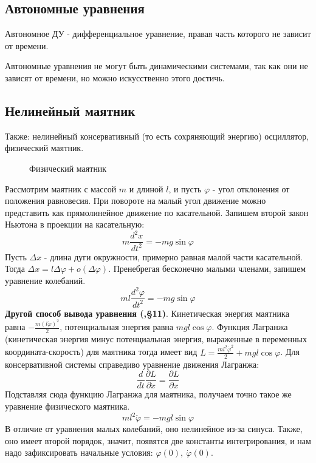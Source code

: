 \subsection{Автономные уравнения}
\begin{defin}
Автономное ДУ - дифференциальное уравнение, правая часть которого не зависит
от времени.
\end{defin}
Автономные уравнения не могут быть динамическими системами, так как они 
не зависят от времени, но можно искусственно этого достичь.
\subsection{Нелинейный маятник}
Также: нелинейный консервативный (то есть сохряняющий энергию)
осциллятор, физический маятник. 
\begin{figure}[H]
    \centering
    \caption{Физический маятник}
    \label{fig:figures-pendulum-pdf_tex}
\end{figure}
Рассмотрим маятник с массой $m$ и длиной $l$, и пусть 
$\varphi$ - угол отклонения от положения равновесия. При повороте на малый 
угол движение можно представить как прямолинейное движение по касательной.
Запишем второй закон Ньютона в проекции на касательную: 
$$m\frac{d^2x}{dt^2}=-mg\sin\varphi$$ 
Пусть $\Delta x$ - длина дуги окружности, примерно равная малой части 
касательной. Тогда  $\Delta x=l\Delta\varphi+o(\Delta\varphi)$.
Пренебрегая бесконечно малыми членами, запишем уравнение колебаний. 
$$ml \frac{d^2\varphi}{dt^2}=-mg\sin\varphi$$ 
\textbf{Другой способ вывода уравнения (\cite{Landau},\S11)}. 
Кинетическая энергия маятника равна $-\frac{m(l\dot\varphi)^2}{2}$,
потенциальная энергия равна $mgl\cos\varphi$. Функция Лагранжа
(кинетическая энергия минус потенциальная энергия, выраженные в переменных
координата-скорость) для маятника тогда имеет вид
$L=\frac{ml^2\dot\varphi^2}{2}+mgl\cos\varphi$. Для консервативной системы
справедиво уравнение движения Лагранжа:
$$\frac{d}{dt}\frac{\partial L}{\partial \dot x}
=\frac{\partial L}{\partial x}$$
Подставляя сюда функцию Лагранжа для маятника, получаем точно такое же 
уравнение физического маятника. 
$$ml^2\ddot \varphi = -mgl\sin\varphi$$
В отличие от уравнения малых колебаний, оно нелинейное из-за синуса. 
Также, оно имеет второй порядок, значит, появятся две константы интегрирования,
и нам надо зафиксировать начальные условия: $\varphi(0),~\dot\varphi(0)$.
